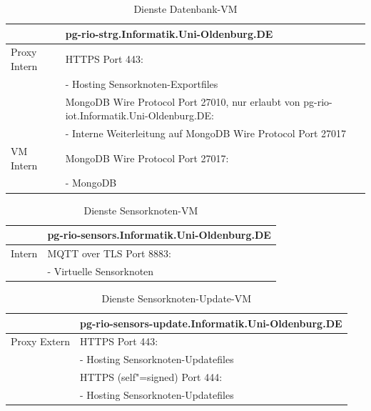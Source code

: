 \begin{table}[H]\caption{Dienste Datenbank-VM}\label{tbl:diedb}
\begin{tabularx}{\textwidth}{|l|X|}
	\hline
	&  \textbf{pg-rio-strg.Informatik.Uni-Oldenburg.DE}\\ 
	\hline Proxy Intern
	& HTTPS Port 443:\\
	& - Hosting Sensorknoten-Exportfiles\\
	& MongoDB Wire Protocol Port 27010, nur erlaubt von pg-rio-iot.Informatik.Uni-Oldenburg.DE:\\
	& - Interne Weiterleitung auf MongoDB Wire Protocol Port 27017\\
	\hline VM Intern
	&  MongoDB Wire Protocol Port 27017:\\
	& - MongoDB\\	 
	\hline
\end{tabularx}
\end{table} 
\par\bigskip 

\begin{table}[H]\caption{Dienste Sensorknoten-VM}\label{tbl:diesen}
\begin{tabularx}{\textwidth}{|l|X|}
	\hline
	&  \textbf{pg-rio-sensors.Informatik.Uni-Oldenburg.DE}\\ 
	\hline Intern
	& MQTT over TLS Port 8883:\\
	& - Virtuelle Sensorknoten\\	 
	\hline
\end{tabularx}
\end{table} 
\par\bigskip 

\begin{table}[H]\caption{Dienste Sensorknoten-Update-VM}\label{tbl:diesenup}
\begin{tabularx}{\textwidth}{|l|X|}
	\hline
	&  \textbf{pg-rio-sensors-update.Informatik.Uni-Oldenburg.DE}\\ 
	\hline Proxy Extern
	& HTTPS Port 443:\\
	& - Hosting Sensorknoten-Updatefiles\\
	& HTTPS (self"=signed) Port 444:\\
	& - Hosting Sensorknoten-Updatefiles\\	 
	\hline
\end{tabularx}
\end{table}
\par\bigskip


